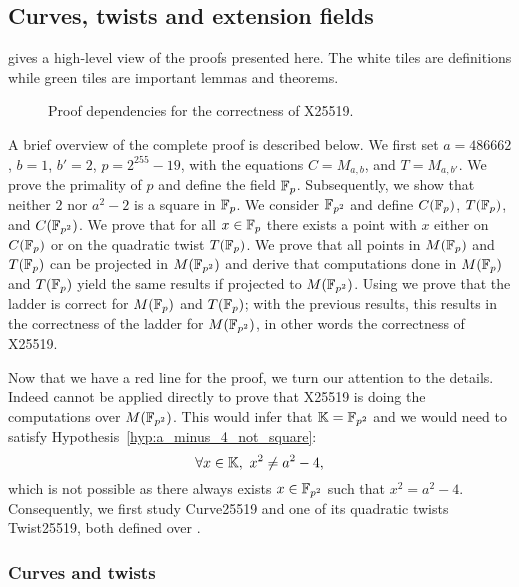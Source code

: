 \subsection{Curves, twists and extension fields}
\label{subsec:curve_twist_fields}

 gives a high-level view of the proofs presented here.
The white tiles are definitions while green tiles are important lemmas and theorems.

\begin{figure}[h]
  \centering
  
  \caption{Proof dependencies for the correctness of X25519.}
  \label{tikz:ProofHighLevel2}
\end{figure}

A brief overview of the complete proof is described below.
We first set $a = 486662$, $b = 1$, $b' = 2$, $p = 2^{255}-19$, with the equations $C = M_{a,b}$, and $T = M_{a,b'}$.
We prove the primality of $p$ and define the field $\mathbb{F}_{p}$.
Subsequently, we show that neither $2$ nor $a^2 - 2$ is a square in $\mathbb{F}_{p}$.
We consider $\mathbb{F}_{p^2}$ and define $C(\mathbb{F}_{p})$, $T(\mathbb{F}_{p})$, and $C(\mathbb{F}_{p^2})$.
We prove that for all $x \in \mathbb{F}_{p}$ there exists a point with \xcoord $x$ either on $C(\mathbb{F}_{p})$ or on the quadratic twist $T(\mathbb{F}_{p})$.
We prove that all points in $M(\mathbb{F}_{p})$ and $T(\mathbb{F}_{p})$ can be projected in $M(\mathbb{F}_{p^2})$ and derive that computations done in $M(\mathbb{F}_{p})$ and $T(\mathbb{F}_{p})$ yield the same results if projected to $M(\mathbb{F}_{p^2})$.
Using  we prove that the ladder is correct for $M(\mathbb{F}_{p})$ and $T(\mathbb{F}_{p})$; with the previous results, this results in the correctness of the ladder for $M(\mathbb{F}_{p^2})$, in other words the correctness of X25519.

Now that we have a red line for the proof, we turn our attention to the details.
Indeed  cannot be applied directly to prove that X25519 is
doing the computations over $M(\mathbb{F}_{p^2})$. This would infer that $\mathbb{K} = \mathbb{F}_{p^2}$ and we would need to satisfy
Hypothesis~\ref{hyp:a_minus_4_not_square}:%
$$\forall x \in \mathbb{K},\ x^2 \neq a^2-4,$$
which is not possible as there always exists $x \in \mathbb{F}_{p^2}$ such that $x^2 = a^2-4$.
Consequently, we first study Curve25519 and one of its quadratic twists Twist25519,
both defined over .

\subsubsection{Curves and twists}
\label{subsec:Zmodp}


